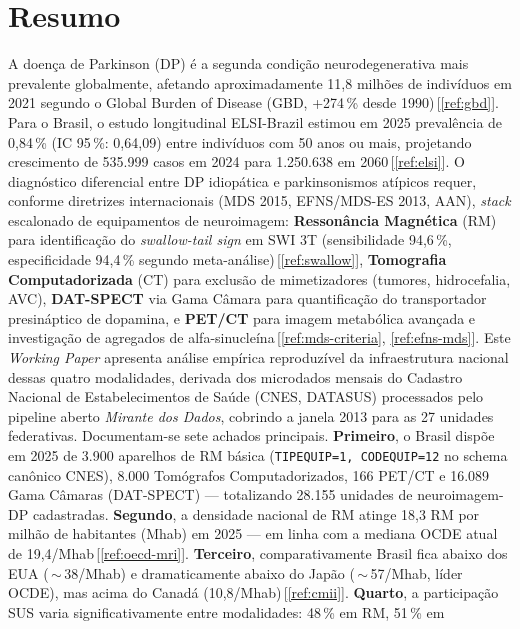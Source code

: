 \documentclass[12pt,a4paper,oneside]{article}
\begin{document}
\section*{Resumo}
\begin{singlespace}\small\noindent
A doença de Parkinson (DP) é a segunda condição neurodegenerativa mais
prevalente globalmente, afetando aproximadamente 11,8 milhões de
indivíduos em 2021 segundo o Global Burden of Disease (GBD,
+274\,\% desde 1990)\,[\ref{ref:gbd}]. Para o Brasil, o estudo
longitudinal ELSI-Brazil estimou em 2025 prevalência de 0,84\,\%
(IC 95\,\%: 0,64,09) entre indivíduos com 50 anos ou
mais, projetando crescimento de 535.999 casos em 2024 para 1.250.638
em 2060\,[\ref{ref:elsi}]. O diagnóstico diferencial entre DP
idiopática e parkinsonismos atípicos requer, conforme diretrizes
internacionais (MDS 2015, EFNS/MDS-ES 2013, AAN), \textit{stack}
escalonado de equipamentos de neuroimagem: \textbf{Ressonância
Magnética} (RM) para identificação do \textit{swallow-tail sign}
em SWI 3T (sensibilidade 94,6\,\%, especificidade 94,4\,\% segundo
meta-análise)\,[\ref{ref:swallow}], \textbf{Tomografia
Computadorizada} (CT) para exclusão de mimetizadores (tumores,
hidrocefalia, AVC), \textbf{DAT-SPECT} via Gama Câmara para
quantificação do transportador presináptico de dopamina, e
\textbf{PET/CT} para imagem metabólica avançada e investigação de
agregados de alfa-sinucleína\,[\ref{ref:mds-criteria},
\ref{ref:efns-mds}]. Este \textit{Working Paper} apresenta análise
empírica reproduzível da infraestrutura nacional dessas quatro
modalidades, derivada dos microdados mensais do Cadastro Nacional de
Estabelecimentos de Saúde (CNES, DATASUS) processados pelo pipeline
aberto \textit{Mirante dos Dados}, cobrindo a janela 2013
para as 27 unidades federativas. Documentam-se sete achados
principais. \textbf{Primeiro}, o Brasil dispõe em 2025 de 3.900
aparelhos de RM básica (\texttt{TIPEQUIP=1, CODEQUIP=12} no schema
canônico CNES), 8.000 Tomógrafos Computadorizados, 166 PET/CT e
16.089 Gama Câmaras (DAT-SPECT) — totalizando 28.155 unidades de
neuroimagem-DP cadastradas. \textbf{Segundo}, a densidade nacional
de RM atinge 18,3 RM por milhão de habitantes (Mhab) em 2025 — em
linha com a mediana OCDE atual de 19,4/Mhab\,[\ref{ref:oecd-mri}].
\textbf{Terceiro}, comparativamente Brasil fica abaixo dos EUA
(\,$\sim$\,38/Mhab) e dramaticamente abaixo do Japão
(\,$\sim$\,57/Mhab, líder OCDE), mas acima do Canadá
(10,8/Mhab)\,[\ref{ref:cmii}]. \textbf{Quarto}, a participação SUS
varia significativamente entre modalidades: 48\,\% em RM, 51\,\% em

\end{singlespace}
\end{document}
